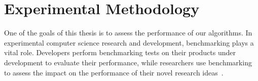 






\section{\label{sec:methodology}Experimental Methodology}

One of the goals of this thesis is to assess the performance of our algorithms. In experimental computer science research and development, benchmarking plays a vital role. Developers perform benchmarking tests on their products under development to evaluate their performance, while researchers use benchmarking to assess the impact on the performance of their novel research ideas~\cite{DBLP_conf_oopsla_GeorgesBE07}.

